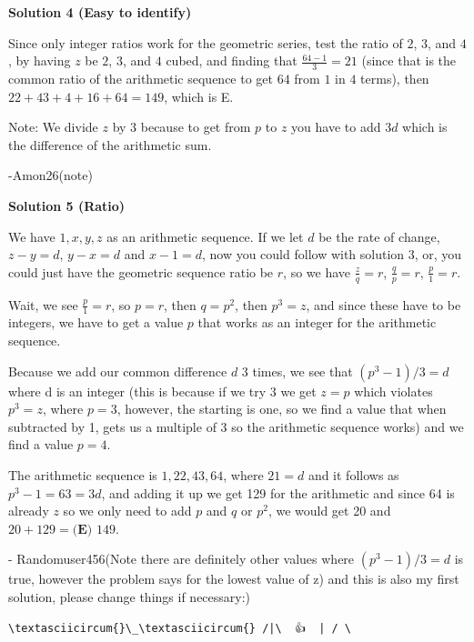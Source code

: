 \begin{enumerate}
\textbf{Solution 4 (Easy to identify)}

Since only integer ratios work for the geometric series, test the ratio of $2$, $3$, and $4$, by having $z$ be $2$, $3$, and $4$ cubed, and finding that $\frac{64-1}{3}=21$ (since that is the common ratio of the arithmetic sequence to get $64$ from $1$ in $4$ terms), then $22+43+4+16+64=149$, which is E.

 Note: We divide $z$ by $3$ because to get from $p$ to $z$ you have to add $3d$ which is the difference of the arithmetic sum.

 -Amon26(note)

 



\textbf{Solution 5 (Ratio)}

We have $1, x, y, z$ as an arithmetic sequence. If we let $d$ be the rate of change, $z - y = d$, $y - x = d$ and $x - 1 = d$, now you could follow with solution 3, or, you could just have the geometric sequence ratio be $r$, so we have $\frac{z}{q} = r$, $\frac{q}{p} = r$, $\frac{p}{1} = r$.

 Wait, we see $\frac{p}{1} = r$, so $p = r$, then $q = p^2$, then $p^3 = z$, and since these have to be integers, we have to get a value $p$ that works as an integer for the arithmetic sequence.

 Because we add our common difference $d$ 3 times, we see that $(p^3-1)/3=d$ where d is an integer (this is because if we try 3 we get $z = p$ which violates $p^3 = z$, where $p = 3$, however, the starting is one, so we find a value that when subtracted by 1, gets us a multiple of 3 so the arithmetic sequence works) and we find a value $p = 4$.

 The arithmetic sequence is $1, 22, 43, 64$, where $21 = d$ and it follows as $p^3 - 1 = 63 = 3d$, and adding it up we get 129 for the arithmetic and since 64 is already $z$ so we only need to add $p$ and $q$ or $p^2$, we would get 20 and $20 + 129 = \boxed{\textbf{(E) } 149}$.

 - Randomuser456(Note there are definitely other values where $(p^3-1)/3=d$ is true, however the problem says for the lowest value of z) and this is also my first solution, please change things if necessary:)

 \begin{verbatim}
\textasciicircum{}\_\textasciicircum{} /|\  👍  | / \
\end{verbatim}






\end{enumerate}
